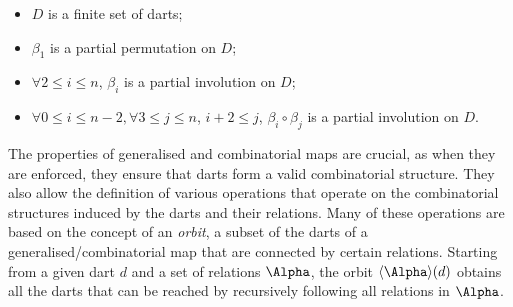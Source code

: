 \begin{itemize}
\item
$D$ is a finite set of darts;

\item
$\beta_{1}$ is a partial permutation on $D$;

\item
$\forall 2 \leq i \leq n$, $\beta_{i}$ is a partial involution on $D$;

\item
$\forall 0 \leq i \leq n-2, \forall 3 \leq j \leq n$, $i+2 \leq j$, $\beta_{i}\circ \beta_{j}$ is a partial involution on $D$.
\end{itemize}

The properties of generalised and combinatorial maps are crucial, as when they are enforced, they ensure that darts form a valid combinatorial structure.
They also allow the definition of various operations that operate on the combinatorial structures induced by the darts and their relations.
Many of these operations are based on the concept of an \emph{orbit}, a subset of the darts of a generalised/combinatorial map that are connected by certain relations.
Starting from a given dart $d$ and a set of relations $\Alpha$, the orbit $\langle\Alpha\rangle(d)$ obtains all the darts that can be reached by recursively following all relations in $\Alpha$.


